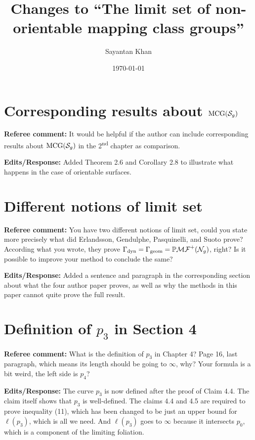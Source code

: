 \documentclass[12pt, reqno]{amsart}
\title{Changes to ``The limit set of non-orientable mapping class groups''}
\author{Sayantan Khan}
\date{\today}
\begin{document}
\maketitle

\section{Corresponding results about $\mathrm{MCG}(\mathcal{S}_g)$}
\label{sec:corr-results-about}

\textbf{Referee comment:} It would be helpful if the author can include corresponding results about $\mathrm{MCG}(\mathcal{S}_g)$ in the 2\textsuperscript{nd} chapter as comparison.

\textbf{Edits/Response:} Added Theorem 2.6 and Corollary 2.8 to illustrate what happens in the case of orientable surfaces.

\section{Different notions of limit set}
\label{sec:diff-noti-limit}

\textbf{Referee comment:} You have two different notions of limit set, could you state more precisely what did Erlandsson, Gendulphe, Pasquinelli, and Suoto prove? According what you wrote, they prove $\Gamma_{\text{dyn}} = \Gamma_{\text{geom}} = \mathbb{P}\mathcal{MF}^+(\mathcal{N}_g)$, right? Is it possible to improve your method to conclude the same?

\textbf{Edits/Response:} Added a sentence and paragraph in the corresponding section about what the four author paper proves, as well as why the methods in this paper cannot quite prove the full result.

\section{Definition of $p_3$ in Section 4}
\label{sec:defin-p_3-sect}

\textbf{Referee comment:} What is the definition of $p_3$ in Chapter 4? Page 16, last paragraph, which means its length should be going to $\infty$, why? Your formula is a bit weird, the left side is $p_4$?

\textbf{Edits/Response:} The curve $p_3$ is now defined after the proof of Claim 4.4. The claim itself shows that $p_3$ is well-defined.
The claims 4.4 and 4.5 are required to prove inequality (11), which has been changed to be just an upper bound for $\ell(p_3)$, which is all we need. And $\ell(p_3)$ goes to $\infty$ because it intersects $p_0$, which is a component of the limiting foliation.
\end{document}
